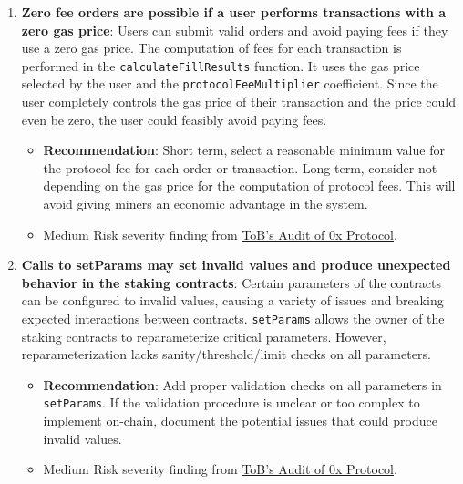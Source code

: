 \begin{enumerate}
\item\textbf{Zero fee orders are possible if a user performs transactions with a zero gas price}: Users can submit valid orders and avoid paying fees if they use a zero gas price. The computation of fees for each transaction is performed in the \verb|calculateFillResults| function. It uses the gas price selected by the user and the \verb|protocolFeeMultiplier| coefficient. Since the user completely controls the gas price of their transaction and the price could even be zero, the user could feasibly avoid paying fees.
	\begin{itemize}
	\item\textbf{Recommendation}: Short term, select a reasonable minimum value for the protocol fee for each order or transaction. Long term, consider not depending on the gas price for the computation of protocol fees. This will avoid giving miners an economic advantage in the system.
	\item Medium Risk severity finding from \href{https://github.com/trailofbits/publications/blob/master/reviews/0x-protocol.pdf}{ToB’s Audit of 0x Protocol}.
	\end{itemize}

\item\textbf{Calls to setParams may set invalid values and produce unexpected behavior in the staking contracts}: Certain parameters of the contracts can be configured to invalid values, causing a variety of issues and breaking expected interactions between contracts. \verb|setParams| allows the owner of the staking contracts to reparameterize critical parameters. However, reparameterization lacks sanity/threshold/limit checks on all parameters.
	\begin{itemize}
	\item\textbf{Recommendation}: Add proper validation checks on all parameters in \verb|setParams|. If the validation procedure is unclear or too complex to implement on-chain, document the potential issues that could produce invalid values.
	\item Medium Risk severity finding from \href{https://github.com/trailofbits/publications/blob/master/reviews/0x-protocol.pdf}{ToB’s Audit of 0x Protocol}.
	\end{itemize}


\end{enumerate}

